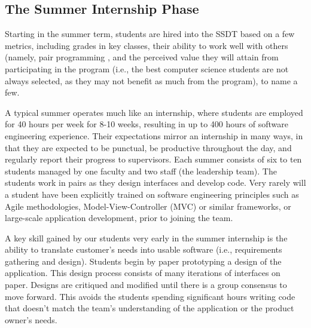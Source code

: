 \subsection{The Summer Internship Phase}
Starting in the summer term, students are hired into the SSDT based on a few metrics, including grades in key classes, their ability to work well with others (namely, pair programming \cite{2002PairProgramming}, and the perceived value they will attain from participating in the program (i.e., the best computer science students are not always selected, as they may not benefit as much from the program), to name a few.

A typical summer operates much like an internship, where students are employed for 40 hours per week for 8-10 weeks, resulting in up to 400 hours of software engineering experience. Their expectations mirror an internship in many ways, in that they are expected to be punctual, be productive throughout the day, and regularly report their progress to supervisors. Each summer consists of six to ten students managed by one faculty and two staff (the leadership team). The students work in pairs as they design interfaces and develop code. Very rarely will a student have been explicitly trained on software engineering principles such as Agile methodologies, Model-View-Controller (MVC) or similar frameworks, or large-scale application development, prior to joining the team.


A key skill gained by our students very early in the summer internship is the ability to translate customer's needs into usable software (i.e., requirements gathering and design). Students begin by paper prototyping \cite{2003paperPrototype} a design of the application. This design process consists of many iterations of interfaces on paper. Designs are critiqued and modified until there is a group consensus to move forward. This avoids the students spending significant hours writing code that doesn’t match the team’s understanding of the application or the product owner’s needs.

